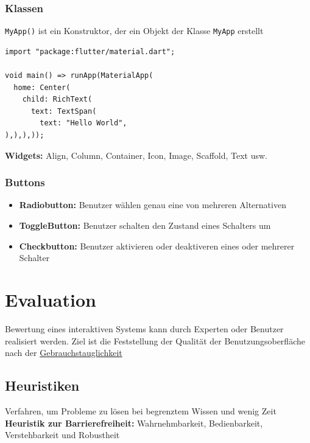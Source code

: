 \documentclass[12pt,landscape]{article}
\def\code#1{\texttt{#1}} %
\begin{document}
\begin{multicols}{3}
\subsubsection{Klassen}
\code{MyApp()} ist ein Konstruktor, der ein Objekt der Klasse \code{MyApp} erstellt
\begin{lstlisting}
import "package:flutter/material.dart";

void main() => runApp(MaterialApp(
  home: Center(
    child: RichText(
      text: TextSpan(
        text: "Hello World",
),),),));
\end{lstlisting}
\textbf{Widgets:} Align, Column, Container, Icon, Image, Scaffold, Text usw.
\subsubsection{Buttons}
\begin{itemize}
\item \textbf{Radiobutton:} Benutzer wählen genau eine von mehreren Alternativen 
\item \textbf{ToggleButton:} Benutzer schalten den Zustand eines Schalters um
\item \textbf{Checkbutton:} Benutzer aktivieren oder deaktiveren eines oder mehrerer Schalter
\end{itemize}
\section{Evaluation}
Bewertung eines interaktiven Systems kann durch Experten oder Benutzer realisiert werden.  Ziel ist die Feststellung der Qualität der Benutzungsoberfläche nach der \hyperlink{Gebrauchstauglichkeit}{Gebrauchstauglichkeit}
\subsection{Heuristiken}
Verfahren, um Probleme zu lösen bei begrenztem Wissen und wenig Zeit\\
\textbf{Heuristik zur Barrierefreiheit:} Wahrnehmbarkeit, Bedienbarkeit, Verstehbarkeit und Robustheit

\end{multicols}
\end{document}
